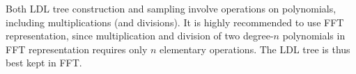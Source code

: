 Both LDL tree construction and sampling involve operations on
polynomials, including multiplications (and divisions). It is highly
recommended to use FFT representation, since multiplication and division
of two degree-$n$ polynomials in FFT representation requires only $n$
elementary operations. The LDL tree is thus best kept in FFT.

%
%
%
%
%
%
